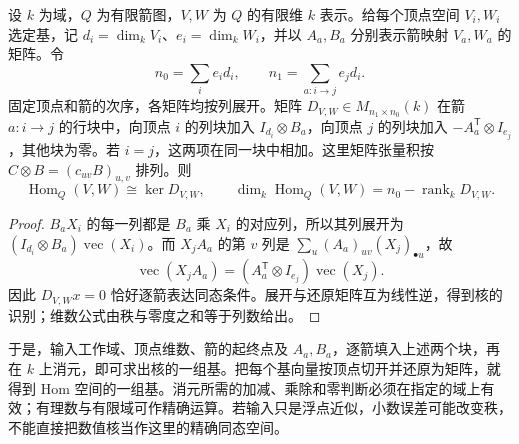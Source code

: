 \begin{proposition}\label{b5:prop:quiver-hom-matrix}
	设 \(k\) 为域，\(Q\) 为有限箭图，\(V,W\) 为 \(Q\) 的有限维 \(k\) 表示。给每个顶点空间 \(V_i,W_i\) 选定基，记 \(d_i=\dim_kV_i\)、\(e_i=\dim_kW_i\)，并以 \(A_a,B_a\) 分别表示箭映射 \(V_a,W_a\) 的矩阵。令
	\[
		n_0=\sum_i e_id_i,\qquad n_1=\sum_{a:i\to j}e_jd_i.
	\]
	固定顶点和箭的次序，各矩阵均按列展开。矩阵 \(D_{V,W}\in M_{n_1\times n_0}(k)\) 在箭 \(a:i\to j\) 的行块中，向顶点 \(i\) 的列块加入 \(I_{d_i}\otimes B_a\)，向顶点 \(j\) 的列块加入 \(-A_a^{\mathsf T}\otimes I_{e_j}\)，其他块为零。若 \(i=j\)，这两项在同一块中相加。这里矩阵张量积按 \(C\otimes B=(c_{uv}B)_{u,v}\) 排列。则
	\[
		\operatorname{Hom}_Q(V,W)\cong\ker D_{V,W},\qquad
		\dim_k\operatorname{Hom}_Q(V,W)=n_0-\operatorname{rank}_kD_{V,W}.
	\]
\end{proposition}
\begin{proof}
	\(B_aX_i\) 的每一列都是 \(B_a\) 乘 \(X_i\) 的对应列，所以其列展开为 \((I_{d_i}\otimes B_a)\operatorname{vec}(X_i)\)。而 \(X_jA_a\) 的第 \(v\) 列是 \(\sum_u(A_a)_{uv}(X_j)_{\bullet u}\)，故
	\[
		\operatorname{vec}(X_jA_a)
		=(A_a^{\mathsf T}\otimes I_{e_j})\operatorname{vec}(X_j).
	\]
	因此 \(D_{V,W}x=0\) 恰好逐箭表达同态条件。展开与还原矩阵互为线性逆，得到核的识别；维数公式由秩与零度之和等于列数给出。
\end{proof}

于是，输入工作域、顶点维数、箭的起终点及 \(A_a,B_a\)，逐箭填入上述两个块，再在 \(k\) 上消元，即可求出核的一组基。把每个基向量按顶点切开并还原为矩阵，就得到 Hom 空间的一组基。消元所需的加减、乘除和零判断必须在指定的域上有效；有理数与有限域可作精确运算。若输入只是浮点近似，小数误差可能改变秩，不能直接把数值核当作这里的精确同态空间。

